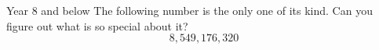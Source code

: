    \begin{MyInnerBox}{Year 8 and below}
     The following number is the only one of its kind. Can you figure out what is so special about it?\\
     \[8,549,176,320\]
      \iftoggle{SOLUTION}{%
      \begin{MySolutionBox}
        All the digits occur in alphabetical order.\\
        Eight, five, four, nine, one, seven, six, three, two, zero.
      \end{MySolutionBox}
    }{}%
    \end{MyInnerBox}

